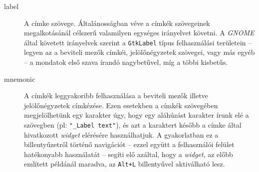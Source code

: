 \begin{description}
  \item[label] A címke szövege. Általánosságban véve a címkék szövegeinek megalkotásánál célszerű valamilyen egységes irányelvet követni. A \textit{GNOME} által követett irányelvek szerint a \texttt{GtkLabel} típus felhasználási területein -- legyen az a beviteli mezők címkéi, jelölőnégyzetek szövegei, vagy más egyéb -- a mondatok első szava írandó nagybetűvel, míg a többi kisbetűs.
  \item[mnemonic] A címkék leggyakoribb felhasználása a beviteli mezők illetve jelölőnégyzetek címkézése. Ezen esetekben a címkék szövegében megjelölhetünk egy karakter úgy, hogy egy aláhúzást karakter írunk elé a szövegben (pl: \texttt{"\_Label text"}), és azt a karaktert később a címke által hivatkozott \textit{widget} elérésére használhatjuk. A gyakorlatban ez a billentyűzetről történő navigációt -- ezzel együtt a felhasználói felület hatékonyabb használatát -- segíti elő azáltal, hogy a \textit{widget}, az előbb említett példánál maradva, az \texttt{Alt+L} billentyűvel aktiválható lesz.
  

\end{description}
